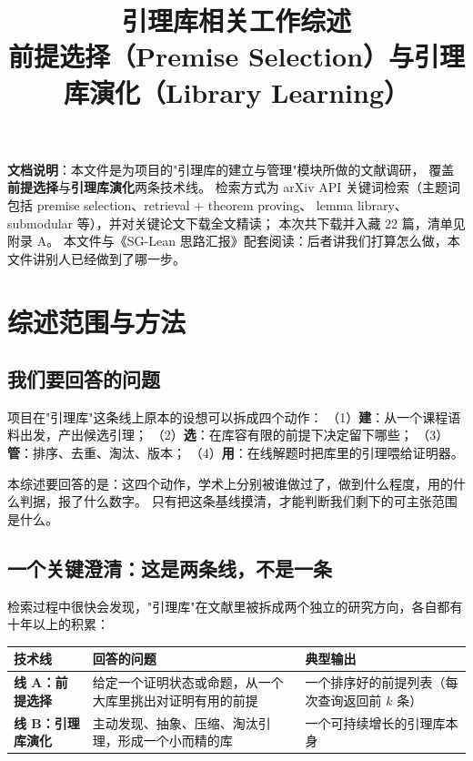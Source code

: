 \documentclass[UTF8,a4paper,11pt,fontset=windows]{ctexart}
\title{\bfseries 引理库相关工作综述\\[2mm]
       \large 前提选择（Premise Selection）与引理库演化（Library Learning）}
\author{}
\date{}
\begin{document}
\maketitle
\thispagestyle{fancy}

\begin{keybox}
\textbf{文档说明}：本文件是为项目的"引理库的建立与管理"模块所做的文献调研，
覆盖\textbf{前提选择}与\textbf{引理库演化}两条技术线。
检索方式为 arXiv API 关键词检索（主题词包括 premise selection、retrieval + theorem proving、
lemma library、submodular 等），并对关键论文下载全文精读；
本次共下载并入藏 22 篇，清单见附录 A。
本文件与《SG-Lean 思路汇报》配套阅读：后者讲我们打算怎么做，本文件讲别人已经做到了哪一步。
\end{keybox}

\vspace{2mm}
\tableofcontents
\vspace{4mm}

\section{综述范围与方法}

\subsection{我们要回答的问题}

项目在"引理库"这条线上原本的设想可以拆成四个动作：
（1）\textbf{建}：从一个课程语料出发，产出候选引理；
（2）\textbf{选}：在库容有限的前提下决定留下哪些；
（3）\textbf{管}：排序、去重、淘汰、版本；
（4）\textbf{用}：在线解题时把库里的引理喂给证明器。

本综述要回答的是：这四个动作，学术上分别被谁做过了，做到什么程度，用的什么判据，报了什么数字。
只有把这条基线摸清，才能判断我们剩下的可主张范围是什么。

\subsection{一个关键澄清：这是两条线，不是一条}

检索过程中很快会发现，"引理库"在文献里被拆成两个独立的研究方向，各自都有十年以上的积累：

\begin{table}[htbp]
\centering
\small
\begin{tabularx}{\textwidth}{@{}p{2.6cm}p{5.2cm}Y@{}}
\toprule
\textbf{技术线} & \textbf{回答的问题} & \textbf{典型输出} \\
\midrule
\textbf{线 A：前提选择} & 给定一个证明状态或命题，从一个大库里挑出对证明有用的前提 &
一个排序好的前提列表（每次查询返回前 $k$ 条） \\
\midrule
\textbf{线 B：引理库演化} & 主动发现、抽象、压缩、淘汰引理，形成一个小而精的库 &
一个可持续增长的引理库本身 \\
\bottomrule
\end{tabularx}
\end{table}
\end{document}
